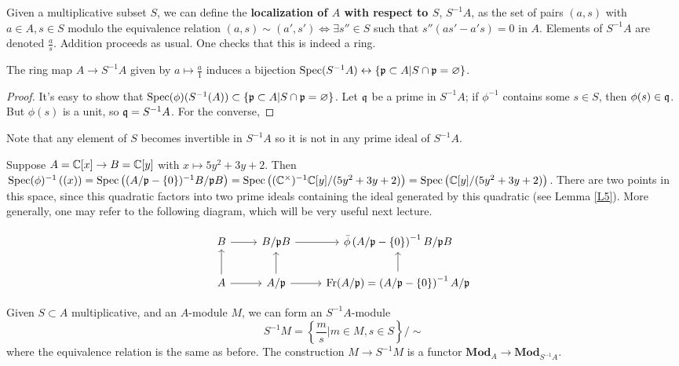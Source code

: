 \documentclass{../mathnotes}
\begin{document}
\begin{defn}
    Given a multiplicative subset $S$, we can define the \textbf{localization of $A$ with respect to $S$}, $S^{-1}A$, as the set of pairs $(a,s)$ with $a\in A,s\in S$ modulo the equivalence relation
    $(a,s)\sim(a',s')\iff \exists s''\in S$ such that $s''(as'-a's)=0$ in $A$. Elements of $S^{-1}A$ are denoted $\frac{a}{s}$. Addition proceeds
    as usual. One checks that this is indeed a ring.
\end{defn}

\begin{lem}
\label{L7}
    The ring map $A\to S^{-1}A$ given by $a\mapsto \frac{a}{1}$ induces a bijection $\operatorname{Spec}(S^{-1}A)\leftrightarrow\left\{ \mathfrak p\subset A|S\cap \mathfrak p=\varnothing \right\}$.
\end{lem}
\begin{proof}
It's easy to show that $\operatorname{Spec}(\phi) (S^{-1}(A)) \subset \{ \mathfrak p\subset A|S\cap \mathfrak p=\varnothing \}$. Let $\mathfrak q$ be a prime in $S^{-1}A$; if $\phi^{-1}$ contains some $s\in S$, then $\phi(s) \in \mathfrak q$. But $\phi(s)$ is a unit, so $\mathfrak q = S^{-1}A$. For the converse, 
\end{proof}
Note that any element of $S$ becomes invertible in $S^{-1}A$ so it is not in any prime ideal of $S^{-1}A$. 

\begin{exmp}
\label{E3}
    Suppose $A=\mathbb{C}[x]\to B=\mathbb{C}[y]$ with $x\mapsto 5y^2+3y+2$. Then $\operatorname{Spec}(\phi)^{-1}\left( (x) \right)=\operatorname{Spec}\left( (A/\mathfrak p-\left\{ 0 \right\})^{-1} B/\mathfrak p B \right)=\operatorname{Spec}\left( (\mathbb{C}^\times)^{-1}\mathbb{C}[y]/(5y^2+3y+2) \right)=\operatorname{Spec}\left(\mathbb{C}[y]/(5y^2+3y+2) \right)$. There are two points in this space, since this quadratic factors into two prime ideals containing the ideal generated by this quadratic (see Lemma \ref{L5}). More generally, one may refer to the following diagram, which will be very useful next lecture.
\end{exmp}

\[
\begin{tikzcd}
B\arrow{r}&B/\fr pB\arrow{r} & \bar\phi\left(A/\fr p-\{0\}\right)^{-1}B/\fr pB\\
A\arrow{r}\arrow{u} & A/\fr p\arrow{r}\arrow{u}&\text{Fr}(A/\fr p)=\left(A/\fr p-\{0\}\right)^{-1}A/\fr p\arrow{u}
\end{tikzcd}
\]

Given $S\subset A$ multiplicative, and an $A$-module $M$, we can form an $S^{-1}A$-module
\[S^{-1}M=\left\{ \frac{m}{s}|m\in M,s\in S \right\}/\sim\]
where the equivalence relation is the same as before. The construction $M\to S^{-1}M$ is a functor $\mathbf{Mod}_A\to\mathbf{Mod}_{S^{-1}A}$.
\end{document}
